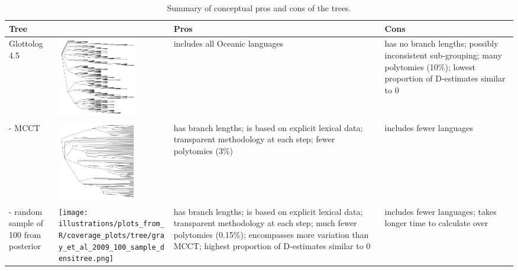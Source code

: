 \documentclass[12pt,letterpaper]{article}
\begin{document}
\begin{table}[ht]
\centering
\caption{Summary of conceptual pros and cons of the trees.}
\label{trees_pros_cons}
\begin{tabular}{m{3cm}m{3.5cm}m{3.8cm}m{3.8cm}}
  \toprule
\textbf{Tree} & &\textbf{Pros} & \textbf{Cons} \\ \midrule
Glottolog 4.5 & \includegraphics[width=3.5cm]{illustrations/plots_from_R/coverage_plots/tree/Oceanic_glottolog_tree_bare.png} &includes all Oceanic languages & has no branch lengths; possibly inconsistent sub-grouping; many polytomies (10\%); lowest proportion of D-estimates similar to 0 \\
\midrule
\citet{grayetal_2009} - MCCT & \includegraphics[width=3.5cm]{illustrations/plots_from_R/coverage_plots/tree/Oceanic_gray_et_al_tree_mcct_bare.png} &has branch lengths; is based on explicit lexical data; transparent methodology at each step; fewer polytomies (3\%) & includes fewer languages \\
\midrule
\citet{grayetal_2009} - random sample of 100 from posterior &  \texttt{[image: illustrations/plots\_from\_R/coverage\_plots/tree/gray\_et\_al\_2009\_100\_sample\_densitree.png]}& has branch lengths; is based on explicit lexical data; transparent methodology at each step; much fewer polytomies (0.15\%); encompasses more variation than MCCT; highest proportion of D-estimates similar to 0 & includes fewer languages; takes longer time to calculate over\\
\bottomrule
\end{tabular}
\end{table}

\FloatBarrier
\end{document}
